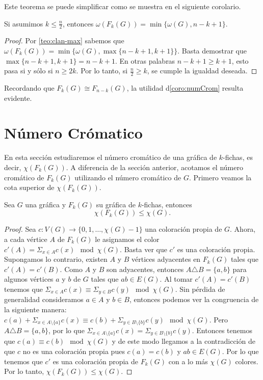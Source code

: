 Este teorema se puede simplificar como se muestra en el siguiente corolario.

\begin{corolario}
\label{coro:numCrom}
    Si asumimos $k \leq \frac{n}{2}$, entonces $\omega(F_k(G))= \min\{\omega(G),
    n-k+1\}$.
\end{corolario}

\begin{proof}
    Por \cref{teo:clan-max} sabemos que $\omega(F_k(G))= \min \{\omega(G), \max
    \{n-k+1,k+1\}\}$. Basta demostrar que $\max \{n-k+1, k+1\} = n-k+1$. En
    otras palabras $n-k+1 \geq k+1$, esto pasa si y s\'olo si $n \geq 2k$. Por
    lo tanto, si $\frac{n}{2} \geq k$, se cumple la igualdad deseada.
\end{proof}

Recordando que $F_k(G) \cong F_{n-k}(G)$, la utilidad  d\cref{coro:numCrom}
resulta evidente.

\section{N\'umero Cr\'omatico}%
\label{sec:num cromatico}

En esta secci\'on estudiaremos el n\'umero crom\'atico de una gr\'afica de
$k$-fichas, es decir, $\chi (F_k(G))$. A diferencia de la secci\'on anterior,
acotamos el n\'umero crom\'atico de $F_k(G)$ utilizando el n\'umero crom\'atico
de $G$. Primero veamos la cota superior de $ \chi (F_k(G))$.

\begin{teorema}
\label{teo:num cromatico de G y F(G)}
    Sea $G$ una gr\'afica y $F_k(G)$ su gr\'afica de $k$-fichas, entonces
    \[
        \chi(F_k(G)) \leq \chi (G).
    \]
\end{teorema}

\begin{proof}
    Sea $c: V(G) \to \{0,1, \dots, \chi(G)-1\}$ una coloraci\'on propia de $G$.
    Ahora, a cada v\'ertice $A$ de $F_k(G)$ le asignamos el color $ c'(A)=
    \Sigma_{x \in A}c(x) \mod \chi(G)$. Basta ver que $c'$ es una coloraci\'on
    propia. Supongamos lo contrario, existen $A$ y $B$ v\'ertices adyacentes en
    $F_k(G)$ tales que $c'(A) = c'(B)$. Como $A$ y $B$ son adyacentes, entonces
    $A \triangle B = \{a,b\}$ para algunos v\'ertices $a$ y $b$ de $G$ tales que
    $ab \in E(G)$. Al tomar $c'(A) = c'(B)$ tenemos que $\Sigma_{x \in A}c(x)
    \equiv \Sigma_{y \in B}c(y) \mod \chi(G)$. Sin p\'erdida de generalidad
    consideramos $a \in A$ y $b \in B$, entonces podemos ver la congruencia de
    la siguiente manera: $c(a) + \Sigma_{x \in A \setminus\{a\}}c(x) \equiv c(b)
    + \Sigma_{y \in B\setminus\{b\}}c(y) \mod \chi(G)$. Pero $A \triangle B =
    \{a,b\}$, por lo que $\Sigma_{x \in A\setminus\{a\}}c(x)=\Sigma_{y \in
    B\setminus\{b\}}c(y)$. Entonces tenemos que $c(a) \equiv c(b) \mod \chi(G)$
    y de este modo llegamos a la contradicci\'on de que $c$ no es una
    coloraci\'on propia pues $c(a) = c(b)$ y $ab \in E(G)$. Por lo que tenemos
    que $c'$ es una coloraci\'on propia de $F_k(G)$ con a lo m\'as $\chi (G)$
    colores. Por lo tanto, $\chi(F_k(G)) \leq \chi (G)$.
\end{proof}

